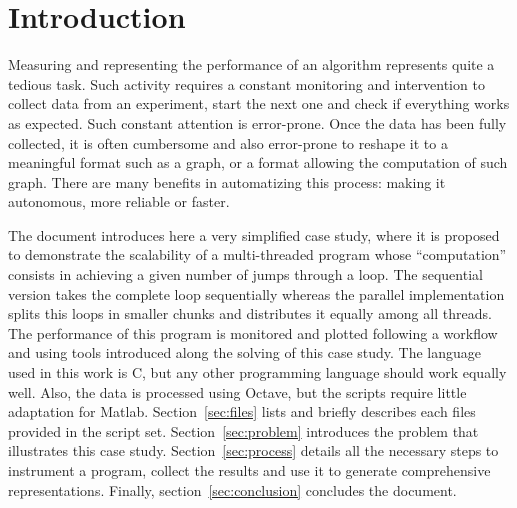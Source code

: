 
\section{Introduction}
Measuring and representing the performance of an algorithm represents quite a tedious task. Such activity requires a constant monitoring and intervention to collect data from an experiment, start the next one and check if everything works as expected. Such constant attention is error-prone. Once the data has been fully collected, it is often cumbersome and also error-prone to reshape it to a meaningful format such as a graph, or a format allowing the computation of such graph. There are many benefits in automatizing this process: making it autonomous, more reliable or faster.

The document introduces here a very simplified case study, where it is proposed to demonstrate the scalability of a multi-threaded program whose ``computation'' consists in achieving a given number of jumps through a loop. The sequential version takes the complete loop sequentially whereas the parallel implementation splits this loops in smaller chunks and distributes it equally among all threads. The performance of this program is monitored and plotted following a workflow and using tools introduced along the solving of this case study. The language used in this work is {C}, but any other programming language should work equally well. Also, the data is processed using Octave, but the scripts require little adaptation for Matlab. Section~\ref{sec:files} lists and briefly describes each files provided in the script set. Section~\ref{sec:problem} introduces the problem that illustrates this case study. Section~\ref{sec:process} details all the necessary steps to instrument a program, collect the results and use it to generate comprehensive representations. Finally, section~\ref{sec:conclusion} concludes the document.

